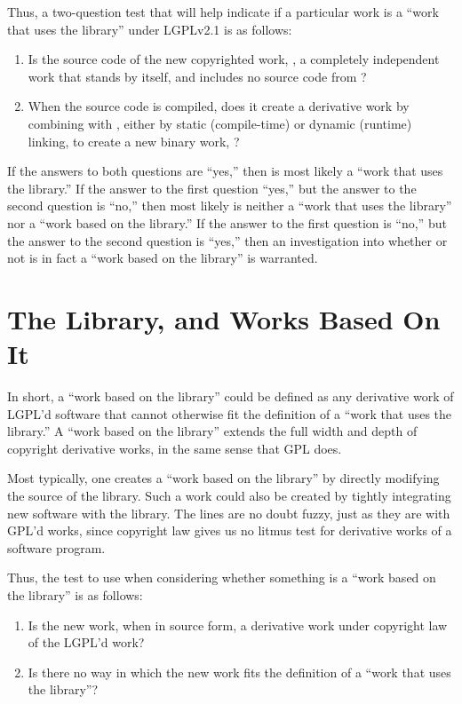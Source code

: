 Thus, a two-question test that will help indicate if a particular work is
a ``work that uses the library'' under LGPLv2.1 is as follows:

\begin{enumerate}

\item Is the source code of the new copyrighted work, \worki{}, a
  completely independent work that stands by itself, and includes no
  source code from \workl{}?

\item When the source code is compiled, does it create a derivative work
  by combining with \workl{}, either by static (compile-time) or dynamic
  (runtime) linking, to create a new binary work, \lplusi{}?
\end{enumerate}

If the answers to both questions are ``yes,'' then \worki{} is most likely
a ``work that uses the library.''  If the answer to the first question
``yes,'' but the answer to the second question is ``no,'' then most likely
\worki{} is neither a ``work that uses the library'' nor a ``work based on
the library.''  If the answer to the first question is ``no,'' but the
answer to the second question is ``yes,'' then an investigation into
whether or not \worki{} is in fact a ``work based on the library'' is
warranted.

\section{The Library, and Works Based On It}

In short, a ``work based on the library'' could be defined as any
derivative work of LGPL'd software that cannot otherwise fit the
definition of a ``work that uses the library.''  A ``work based on the
library'' extends the full width and depth of copyright derivative works,
in the same sense that GPL does.

Most typically, one creates a ``work based on the library'' by directly
modifying the source of the library. Such a work could also be created by
tightly integrating new software with the library. The lines are no doubt
fuzzy, just as they are with GPL'd works, since copyright law gives us no
litmus test for derivative works of a software program.

Thus, the test to use when considering whether something is a ``work
based on the library'' is as follows:

\begin{enumerate}

\item Is the new work, when in source form, a derivative work under
  copyright law of the LGPL'd work?

\item Is there no way in which the new work fits the definition of a
  ``work that uses the library''?
\end{enumerate}


